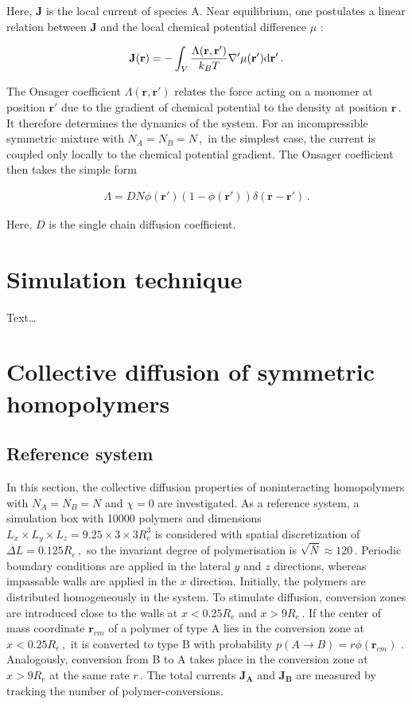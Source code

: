 \documentclass[bachelor,       %
               twoside,        %
               BCOR10mm,       %
                ngerman,english  %
               ]{GAUBM}
\begin{document}
Here, $\mathbf{J}$ is the local current of species A. Near equilibrium, one postulates a linear relation between $\mathbf J$ and the local chemical potential difference $\mu$ \cite{deGennes80}:


\begin{align}
    \mathbf J(\mathbf{r})=-\int_V\frac{\Lambda(\mathbf{r}, \mathbf{r'})}{k_BT}\nabla '\mu(\mathbf{r'})\text d \mathbf{r'}\,.
    \label{eq:current}
\end{align}

The Onsager coefficient $\Lambda(\mathbf{r}, \mathbf{r'})$ relates the force acting on a monomer at position $\mathbf{r'}$ due to the gradient of chemical potential to the density at position $\mathbf{r}\,$. It therefore determines the dynamics of the system. For an incompressible symmetric mixture with $N_A=N_B=N\,,$ in the simplest case, the current is coupled only locally to the chemical potential gradient. The Onsager coefficient then takes the simple form \cite{deGennes80, Binder83}

\begin{align}
  \Lambda=DN\phi(\mathbf{r'})(1-\phi(\mathbf{r'}))\delta(\mathbf{r}-\mathbf{r'})\,.
  \label{eq:onsager}
\end{align}

Here, $D$ is the single chain diffusion coefficient.

\chapter{Simulation technique}
Text\dots

\chapter{Collective diffusion of symmetric homopolymers}

\section{Reference system}

In this section, the collective diffusion properties of noninteracting homopolymers with $N_A=N_B=N$ and $\chi=0$ are investigated. As a reference system, a simulation box with 10000 polymers and dimensions $L_x\times L_y\times L_z=9.25\times3\times3R_e^3$ is considered with spatial discretization of $\Delta L=0.125R_e\,,$ so the invariant degree of polymerisation is $\sqrt{\bar{N}}\approx 120\,.$ Periodic boundary conditions are applied in the lateral $y$ and $z$ directions, whereas impassable walls are applied in the $x$ direction. Initially, the polymers are distributed homogeneously in the system. To stimulate diffusion, conversion zones are introduced close to the walls at $x<0.25R_e$ and $x>9R_e\,.$ If the center of mass coordinate $\mathbf r_{cm}$ of a polymer of type A lies in the conversion zone at $x<0.25R_e\,,$ it is converted to type B with probability $p(A\rightarrow B)=r\phi(\mathbf r_{cm})$ \cite{Dreyer22}. Analogously, conversion from B to A takes place in the conversion zone at $x>9R_e$ at the same rate $r\,.$ The total currents $\mathbf{J_A}$ and $\mathbf{J_B}$ are measured by tracking the number of polymer-conversions. 
\end{document}
